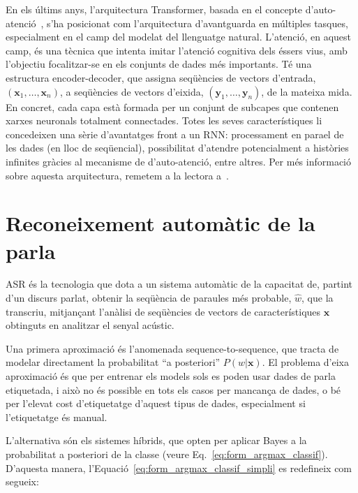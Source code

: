 En els últims anys, l'arquitectura Transformer, basada en el concepte d'auto-atenció~\cite{vaswani2017transformers}, s'ha posicionat com l'arquitectura d'avantguarda en múltiples tasques, especialment en el camp del modelat del llenguatge natural.
L'atenció, en aquest camp, és una tècnica que intenta imitar l'atenció cognitiva dels éssers vius, amb l'objectiu focalitzar-se en els conjunts de dades més importants.
Té una estructura encoder-decoder, que assigna seqüències de vectors d'entrada, $(\textbf{x}_1, \dots, \textbf{x}_n)$, a seqüències de vectors d'eixida, $(\textbf{y}_1, \dots, \textbf{y}_n)$, de la mateixa mida. En concret, cada capa està formada per un conjunt de subcapes que contenen xarxes neuronals totalment connectades.
Totes les seves característiques li concedeixen una sèrie d'avantatges front a un RNN: processament en para\lgem el de les dades (en lloc de seqüencial), possibilitat d'atendre potencialment a històries infinites gràcies al mecanisme de d'auto-atenció, entre altres.
Per més informació sobre aquesta arquitectura, remetem a la lectora a~\cite[capítol 9.7]{jurafskySLP}.




\section{Reconeixement automàtic de la parla}
\label{cap02_recon_autom_parla}

ASR és la tecnologia que dota a un sistema automàtic de la capacitat de, partint d'un discurs parlat, obtenir la seqüència de paraules més probable, $\hat{w}$, que la transcriu, mitjançant l'anàlisi de seqüències de vectors de característiques $\textbf{x}$ obtinguts en analitzar el senyal acústic.

Una primera aproximació és l'anomenada sequence-to-sequence, que tracta de modelar directament la probabilitat ``a posteriori'' $P(w | \textbf{x})$. 
El problema d'eixa aproximació és que per entrenar els models sols es poden usar dades de parla etiquetada, i això no és possible en tots els casos per mancança de dades, o bé per l'elevat cost d'etiquetatge d'aquest tipus de dades, especialment si l'etiquetatge és manual. 

L'alternativa són els sistemes híbrids, que opten per aplicar Bayes a la probabilitat a posteriori de la classe (veure Eq.~\ref{eq:form_argmax_classif}). D'aquesta manera, l'Equació~\ref{eq:form_argmax_classif_simpli} es redefineix com segueix:

